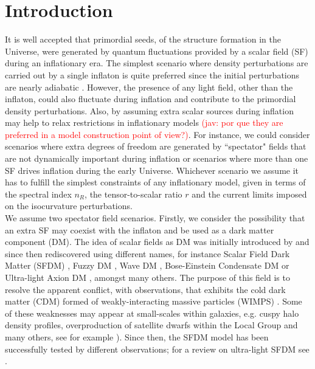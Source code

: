 \documentclass[amssymb,twocolumn,prd,nofootinbib,showpacs]{revtex4-1}
\newcommand{\jav}[1]{\textcolor{red}{(jav: #1)}}
\begin{document}
\section{Introduction}
\label{introduction}

It is well accepted that primordial seeds, of the structure formation in the Universe, were generated by quantum 
fluctuations provided by a scalar field (SF) during an inflationary era. 
The simplest scenario where density perturbations are carried out by a single inflaton is quite preferred since the initial 
perturbations are nearly adiabatic \cite{const1,const2,planck}. However, the presence of any light field, other than the inflaton, 
could also fluctuate during inflation and contribute to the primordial density perturbations. 
%
Also, by assuming extra scalar sources during inflation may help to relax restrictions in inflationary models
\jav{por que they are preferred in a model construction point of view?}.
For instance, we could consider scenarios where extra degrees of freedom are generated by ``spectator" 
fields that are not dynamically important during inflation or scenarios where more than one SF drives inflation 
during the early Universe. 
%
Whichever scenario we assume it has to fulfill the simplest constraints of any inflationary model, given in terms of the 
spectral index $n_R$, the tensor-to-scalar ratio $r$ and the current limits imposed on the isocurvature perturbations. 
\\

We assume two spectator field scenarios.
%
Firstly, we consider the possibility that an extra SF may coexist with the inflaton and be used as a dark matter component (DM). 
The idea of scalar fields as DM was initially introduced by \cite{SF1} and since then rediscovered 
using different names, for instance Scalar Field Dark Matter  (SFDM)  \cite{SF2},  Fuzzy  DM  \cite{SF3}, 
Wave DM \cite{SF4,SF5}, Bose-Einstein Condensate DM \cite{SF6} or Ultra-light Axion DM \cite{SF7,SF8}, amongst many others. 
%
The purpose of this field is to resolve the apparent conflict, with observations, that exhibits the
cold dark matter (CDM) formed of weakly-interacting massive particles (WIMPS) \cite{LCDM1,LCDM2}. 
Some of these weaknesses may appear at small-scales within galaxies, e.g. cuspy halo density profiles, overproduction of 
satellite dwarfs within the Local Group and many others, see for example \cite{problem1,problem2,problem3,problem4,problem5}). 
Since then, the SFDM model has been successfully tested by different observations;  
for a review on ultra-light SFDM see \cite{SF9,SF10,SF11,SF12}. 
\end{document}
